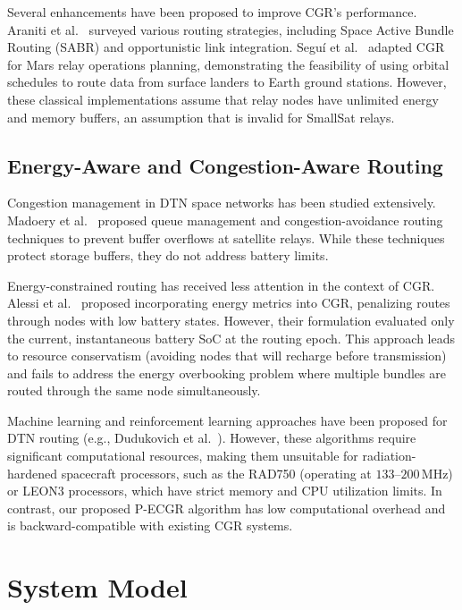 \documentclass[journal,twocolumn]{IEEEtran}
\newcommand{\pecgr}{\textsf{P-ECGR}}
\begin{document}
Several enhancements have been proposed to improve CGR's performance. Araniti et al.~\cite{araniti2015contact} surveyed various routing strategies, including Space Active Bundle Routing (SABR) and opportunistic link integration. Segu{\'i} et al.~\cite{segui2011enhancing} adapted CGR for Mars relay operations planning, demonstrating the feasibility of using orbital schedules to route data from surface landers to Earth ground stations. However, these classical implementations assume that relay nodes have unlimited energy and memory buffers, an assumption that is invalid for SmallSat relays.

\subsection{Energy-Aware and Congestion-Aware Routing}
Congestion management in DTN space networks has been studied extensively. Madoery et al.~\cite{madoery2020congestion} proposed queue management and congestion-avoidance routing techniques to prevent buffer overflows at satellite relays. While these techniques protect storage buffers, they do not address battery limits.

Energy-constrained routing has received less attention in the context of CGR. Alessi et al.~\cite{alessi2019energy} proposed incorporating energy metrics into CGR, penalizing routes through nodes with low battery states. However, their formulation evaluated only the current, instantaneous battery SoC at the routing epoch. This approach leads to resource conservatism (avoiding nodes that will recharge before transmission) and fails to address the energy overbooking problem where multiple bundles are routed through the same node simultaneously. 

Machine learning and reinforcement learning approaches have been proposed for DTN routing (e.g., Dudukovich et al.~\cite{dudukovich2019dtn}). However, these algorithms require significant computational resources, making them unsuitable for radiation-hardened spacecraft processors, such as the RAD750 (operating at $133$--$200\,$MHz) or LEON3 processors, which have strict memory and CPU utilization limits. In contrast, our proposed \pecgr{} algorithm has low computational overhead and is backward-compatible with existing CGR systems.

\section{System Model}
\label{sec:system}
\end{document}
